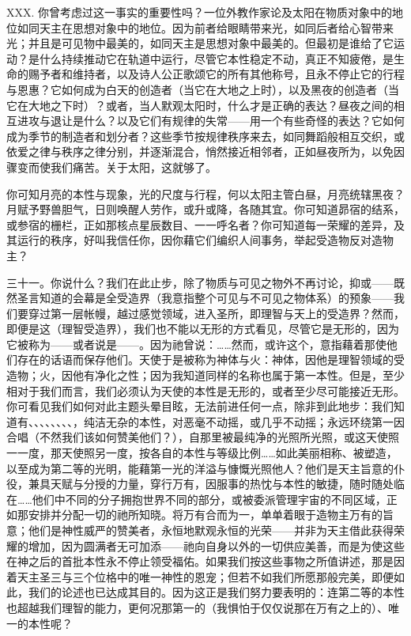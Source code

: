 XXX. 你曾考虑过这一事实的重要性吗？一位外教作家论及太阳在物质对象中的地位如同天主在思想对象中的地位。因为前者给眼睛带来光，如同后者给心智带来光；并且是可见物中最美的，如同天主是思想对象中最美的。但最初是谁给了它运动？是什么持续推动它在轨道中运行，尽管它本性稳定不动，真正不知疲倦，是生命的赐予者和维持者，以及诗人公正歌颂它的所有其他称号，且永不停止它的行程与恩惠？它如何成为白天的创造者（当它在大地之上时），以及黑夜的创造者（当它在大地之下时）？或者，当人默观太阳时，什么才是正确的表达？昼夜之间的相互进攻与退让是什么？以及它们有规律的失常——用一个有些奇怪的表达？它如何成为季节的制造者和划分者？这些季节按规律秩序来去，如同舞蹈般相互交织，或依爱之律与秩序之律分别，并逐渐混合，悄然接近相邻者，正如昼夜所为，以免因骤变而使我们痛苦。关于太阳，这就够了。\par

你可知月亮的本性与现象，光的尺度与行程，何以太阳主管白昼，月亮统辖黑夜？月赋予野兽胆气，日则唤醒人劳作，或升或降，各随其宜。你可知道昴宿的结系，或参宿的栅栏，正如那核点星辰数目、一一呼名者？你可知道每一荣耀的差异，及其运行的秩序，好叫我信任你，因你藉它们编织人间事务，举起受造物反对造物主？\par

三十一。你说什么？我们在此止步，除了物质与可见之物外不再讨论，抑或——既然圣言知道的会幕是全受造界（我意指整个可见与不可见之物体系）的预象——我们要穿过第一层帐幔，越过感觉领域，进入圣所，即理智与天上的受造界？然而，即便是这（理智受造界），我们也不能以无形的方式看见，尽管它是无形的，因为它被称为——或者说是——。因为祂曾说：……然而，或许这个，意指藉着那使他们存在的话语而保存他们。天使于是被称为神体与火：神体，因他是理智领域的受造物；火，因他有净化之性；因为我知道同样的名称也属于第一本性。但是，至少相对于我们而言，我们必须认为天使的本性是无形的，或者至少尽可能接近无形。你可看见我们如何对此主题头晕目眩，无法前进任何一点，除非到此地步：我们知道有、、、、、、、、，纯洁无杂的本性，对恶毫不动摇，或几乎不动摇；永远环绕第一因合唱（不然我们该如何赞美他们？），自那里被最纯净的光照所光照，或这天使照一一度，那天使照另一度，按各自的本性与等级比例……如此美丽相称、被塑造，以至成为第二等的光明，能藉第一光的洋溢与慷慨光照他人？他们是天主旨意的仆役，兼具天赋与分授的力量，穿行万有，因服事的热忱与本性的敏捷，随时随处临在……他们中不同的分子拥抱世界不同的部分，或被委派管理宇宙的不同区域，正如那安排并分配一切的祂所知晓。将万有合而为一，单单着眼于造物主万有的旨意；他们是神性威严的赞美者，永恒地默观永恒的光荣——并非为天主借此获得荣耀的增加，因为圆满者无可加添——祂向自身以外的一切供应美善，而是为使这些在神之后的首批本性永不停止领受福佑。如果我们按这些事物之所值讲述，那是因着天主圣三与三个位格中的唯一神性的恩宠；但若不如我们所愿那般完美，即便如此，我们的论述也已达成其目的。因为这正是我们努力要表明的：连第二等的本性也超越我们理智的能力，更何况那第一的（我惧怕于仅仅说那在万有之上的）、唯一的本性呢？\par

